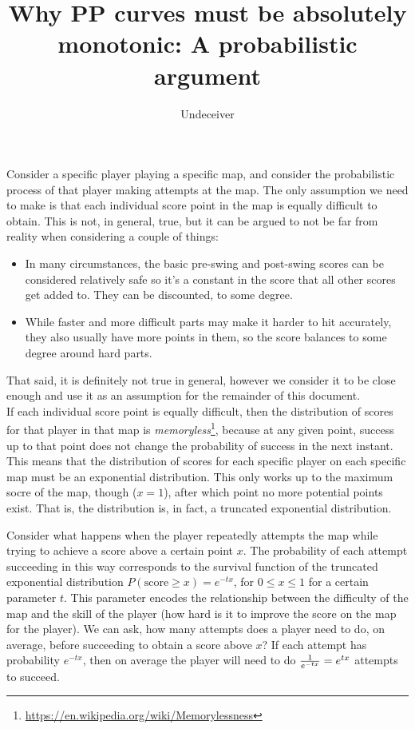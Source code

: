 \documentclass[12pt,a4paper]{article}
\title{Why PP curves must be absolutely monotonic: A probabilistic argument}
\author{Undeceiver}
\begin{document}
\maketitle



Consider a specific player playing a specific map, and consider the probabilistic process of that player making attempts at the map. The only assumption we need to make is that each individual score point in the map is equally difficult to obtain. This is not, in general, true, but it can be argued to not be far from reality when considering a couple of things:
\begin{itemize}
\item In many circumstances, the basic pre-swing and post-swing scores can be considered relatively safe so it's a constant in the score that all other scores get added to. They can be discounted, to some degree.
\item While faster and more difficult parts may make it harder to hit accurately, they also usually have more points in them, so the score balances to some degree around hard parts.
\end{itemize}

That said, it is definitely not true in general, however we consider it to be close enough and use it as an assumption for the remainder of this document.\\

If each individual score point is equally difficult, then the distribution of scores for that player in that map is {\emph{memoryless}}\footnote{\url{https://en.wikipedia.org/wiki/Memorylessness}}, because at any given point, success up to that point does not change the probability of success in the next instant. This means that the distribution of scores for each specific player on each specific map must be an exponential distribution. This only works up to the maximum socre of the map, though ($x = 1$), after which point no more potential points exist. That is, the distribution is, in fact, a truncated exponential distribution.

Consider what happens when the player repeatedly attempts the map while trying to achieve a score above a certain point $x$. The probability of each attempt succeeding in this way corresponds to the survival function of the truncated exponential distribution $P(\text{score} \geq x) = e^{-tx}$, for $0 \leq x \leq 1$ for a certain parameter $t$. This parameter encodes the relationship between the difficulty of the map and the skill of the player (how hard is it to improve the score on the map for the player). We can ask, how many attempts does a player need to do, on average, before succeeding to obtain a score above $x$? If each attempt has probability $e^{-tx}$, then on average the player will need to do ${{1} \over {e^{-tx}}} = e^{tx}$ attempts to succeed.\\
\end{document}
